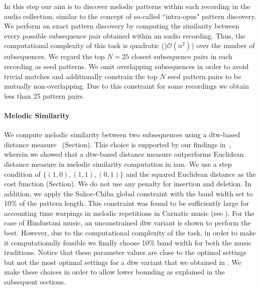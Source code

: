 In this step our aim is to discover melodic patterns within each recording in the audio collection, similar to the concept of so-called ``intra-opus" pattern discovery. We perform an exact pattern discovery by computing the similarity between every possible subsequence pair obtained within an audio recording. Thus, the computational complexity of this task is quadratic ()$\mathcal{O}(n^2)$) over the number of subsequences. We regard the top $N=25$ closest subsequence pairs in each recording as seed patterns. We omit overlapping subsequences in order to avoid trivial matches and additionally constrain the top $N$ seed pattern pairs to be mutually non-overlapping. Due to this constraint for some recordings we obtain less than 25 pattern pairs. 


\paragraph{Melodic Similarity} 

We compute melodic similarity between two subsequences using a \gls{dtw}-based distance measure~\cite{Sakoe78TASLP} (Section). This choice is supported by our findings in~, wherein we showed that a \gls{dtw}-based distance measure outperforms Euclidean distance measure in melodic similarity computation in \gls{iam}. We use a step condition of $\lbrace(1,0), (1,1), (0,1)\rbrace$ and the squared Euclidean distance as the cost function (Section). We do not use any penalty for insertion and deletion. In addition, we apply the Sakoe-Chiba global constraint with the band width set to 10\% of the pattern length. This constraint was found to be sufficiently large for accounting time warpings in melodic repetitions in Carnatic music (see ). For the case of Hindustani music, an unconstrained \gls{dtw} variant is shown to perform the best. However, due to the computational complexity of the task, in order to make it computationally feasible we finally choose 10\% band width for both the music traditions. Notice that these parameter values are close to the optimal settings but not the most optimal settings for a \gls{dtw} variant that we obtained in . We make these choices in order to allow lower bounding as explained in the subsequent sections. 

	

